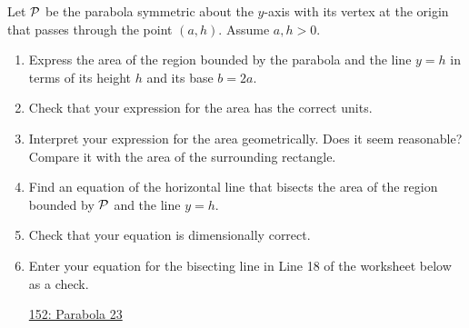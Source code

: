 \documentclass{ximera}
\begin{document}
\begin{question} \label{Q88w88ewe}
Let ${\cal P}$ be the parabola symmetric about the $y$-axis with its vertex at the origin that passes through the point $(a,h)$. Assume $a,h>0$.

\begin{enumerate}

\item Express the area of the region bounded by the parabola and the line $y=h$ in terms of its height $h$ and its base $b=2a$.

\item Check that your expression for the area has the correct units. 

\item Interpret  your expression for the area geometrically. Does it seem reasonable? Compare it with the area of the surrounding rectangle.

\item Find an equation of the horizontal line that bisects the area of the region bounded by ${\cal P}$ and the line $y=h$.

\item Check that your equation is dimensionally correct.

\item Enter your equation for the bisecting line in Line 18 of the worksheet below as a check.

\begin{onlineOnly}
    \begin{center}
\end{center}
\end{onlineOnly}

\href{https://www.desmos.com/calculator/mbxrsmdho8}{152: Parabola 23}

\end{enumerate}
\end{question}
\end{document}

